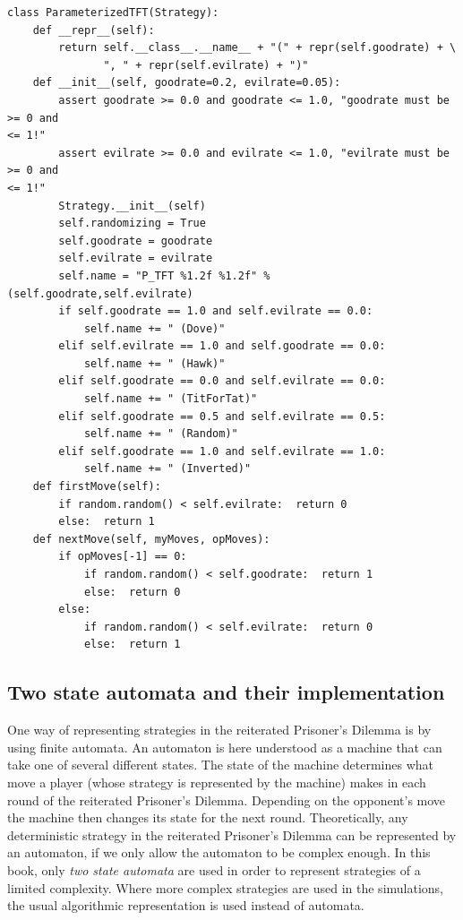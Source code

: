 \begin{scriptsize}
\begin{verbatim}
class ParameterizedTFT(Strategy):
    def __repr__(self):
        return self.__class__.__name__ + "(" + repr(self.goodrate) + \
               ", " + repr(self.evilrate) + ")"
    def __init__(self, goodrate=0.2, evilrate=0.05):
        assert goodrate >= 0.0 and goodrate <= 1.0, "goodrate must be >= 0 and
<= 1!"
        assert evilrate >= 0.0 and evilrate <= 1.0, "evilrate must be >= 0 and
<= 1!"
        Strategy.__init__(self)
        self.randomizing = True
        self.goodrate = goodrate
        self.evilrate = evilrate
        self.name = "P_TFT %1.2f %1.2f" % (self.goodrate,self.evilrate)
        if self.goodrate == 1.0 and self.evilrate == 0.0:
            self.name += " (Dove)"
        elif self.evilrate == 1.0 and self.goodrate == 0.0:
            self.name += " (Hawk)"
        elif self.goodrate == 0.0 and self.evilrate == 0.0:
            self.name += " (TitForTat)"
        elif self.goodrate == 0.5 and self.evilrate == 0.5:
            self.name += " (Random)"
        elif self.goodrate == 1.0 and self.evilrate == 1.0:
            self.name += " (Inverted)"
    def firstMove(self):
        if random.random() < self.evilrate:  return 0
        else:  return 1
    def nextMove(self, myMoves, opMoves):
        if opMoves[-1] == 0:
            if random.random() < self.goodrate:  return 1
            else:  return 0
        else:
            if random.random() < self.evilrate:  return 0
            else:  return 1
\end{verbatim}
\end{scriptsize}

\subsection{Two state automata and their implementation}
\label{twoStateAutomata}
One way of representing strategies in the reiterated Prisoner's
Dilemma is by using finite automata. An automaton is here understood
as a machine that can take one of several different states. The state
of the machine determines what move a player (whose strategy is
represented by the machine) makes in each round of the reiterated
Prisoner's Dilemma. Depending on the opponent's move the
machine then changes its state for the next round. Theoretically, any
deterministic strategy in the reiterated Prisoner's Dilemma can be represented
by an automaton, if we only allow the automaton to be complex enough. In
this book, only {\em two state automata} are used in order to
represent strategies of a limited complexity. Where more complex
strategies are used in the simulations, the usual algorithmic
representation is used instead of automata.

